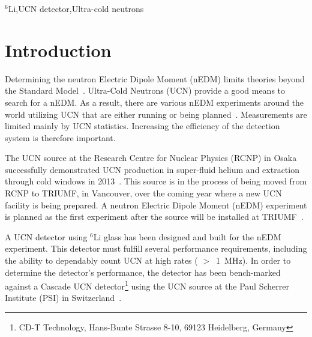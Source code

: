 \documentclass[twocolumn]{bmcart}
\begin{document}
\begin{frontmatter}
\begin{abstractbox}
\begin{abstract}
\end{abstract}

\begin{keyword}
$^6$Li\sep UCN detector\sep Ultra-cold neutrons 
\end{keyword}

\end{abstractbox}

\end{frontmatter}

\linenumbers


\section{Introduction}

Determining the neutron Electric Dipole Moment (nEDM) limits theories
beyond the Standard Model~\cite{pospelov}.  Ultra-Cold Neutrons (UCN)
provide a good means to search for a nEDM.  As a result, there are
various nEDM experiments around the world utilizing UCN that are
either running or being
planned~\cite{fillipone,PSI,Gatchina,APSerebov,KKirch,CABaker,YMasuda,IAltarev,RGolub,SNS}.
Measurements are limited mainly by UCN statistics.  Increasing the
efficiency of the detection system is therefore important.

The UCN source at the Research Centre for Nuclear Physics (RCNP) in
Osaka successfully demonstrated UCN production in super-fluid helium
and extraction through cold windows in 2013~\cite{kawasaki2014}.  This
source is in the process of being moved from RCNP to TRIUMF, in
Vancouver, over the coming year where a new UCN facility is being
prepared.  A neutron Electric Dipole Moment (nEDM) experiment is
planned as the first experiment after the source will be installed at
TRIUMF~\cite{jeffucn}.

A UCN detector using $^6$Li glass has been designed and built for the
nEDM experiment.  This detector must fulfill several performance
requirements, including the ability to dependably count UCN at high
rates ( $>$~1~MHz).  In order to determine the detector's performance,
the detector has been bench-marked against a Cascade UCN
detector\footnote{CD-T Technology, Hans-Bunte Strasse 8-10, 69123
  Heidelberg, Germany} using the UCN source at the Paul Scherrer
Institute (PSI) in Switzerland~\cite{BLaussAIP2012, BLaussHFI2012,
  BLaussPP2014}.
\end{document}
